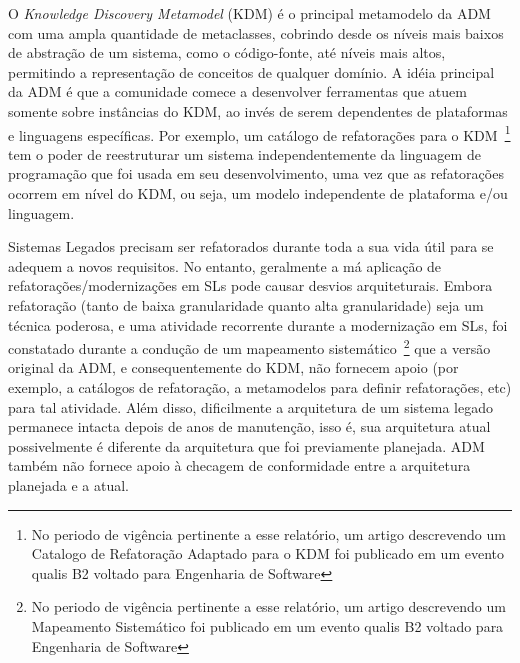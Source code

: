 O \textit{Knowledge Discovery Metamodel} (KDM) é o principal metamodelo da ADM com uma ampla quantidade de metaclasses, cobrindo desde os níveis mais baixos de abstração de um sistema, como o código-fonte, até níveis mais altos, permitindo a representação de conceitos de qualquer domínio. A idéia principal da ADM é que a comunidade comece a desenvolver ferramentas que atuem somente sobre instâncias do KDM, ao invés de serem dependentes de plataformas e linguagens específicas. Por exemplo, um catálogo de refatorações para o KDM~\citep{iri_catalogue_of_refactoring_2014}\footnote{No periodo de vigência pertinente a esse relatório, um artigo descrevendo um Catalogo de Refatoração Adaptado para o KDM foi publicado em um evento qualis B2 voltado para Engenharia de Software} tem o poder de reestruturar um sistema independentemente da linguagem de programação que foi usada em seu desenvolvimento, uma vez que as refatorações ocorrem em nível do KDM, ou seja, um modelo independente de plataforma e/ou linguagem. 

Sistemas Legados precisam ser refatorados durante toda a sua vida útil para se adequem a novos requisitos. No entanto, geralmente a má aplicação de refatorações/modernizações em SLs pode causar desvios arquiteturais. Embora refatoração (tanto de baixa granularidade quanto alta granularidade) seja um técnica poderosa, e uma atividade recorrente durante a modernização  em SLs, foi constatado durante a condução de um mapeamento sistemático~\citep{iri_systematic_mapping_ADM_2014}\footnote{No periodo de vigência pertinente a esse relatório, um artigo descrevendo um Mapeamento Sistemático foi publicado em um evento qualis B2 voltado para Engenharia de Software} 
que a versão original da ADM, e consequentemente do KDM, não fornecem apoio (por exemplo, a catálogos de refatoração, a metamodelos para definir refatorações, etc) para tal atividade. Além disso, dificilmente a arquitetura de um sistema legado permanece intacta depois de anos de manutenção, isso é, sua arquitetura atual possivelmente é diferente da arquitetura que foi previamente planejada. ADM também não fornece apoio à checagem de conformidade entre a arquitetura planejada e a atual.

